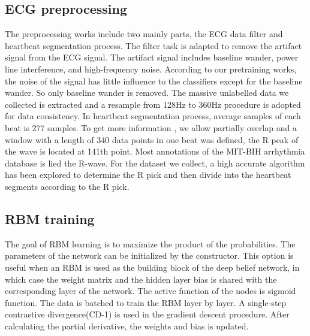 \documentclass[conference]{IEEEtran}
\begin{document}
\subsection{ECG preprocessing}

The preprocessing works include two mainly parts, the ECG data filter and heartbeat segmentation process. The filter task is adapted to remove the artifact signal from the ECG signal. The artifact signal includes baseline wander, power line interference, and high-frequency noise. According to our pretraining works, the noise of the signal has little influence to the classifiers except for the baseline wander. So only baseline wander is removed. The massive unlabelled data we collected is extracted and a resample from 128Hz to 360Hz procedure is adopted for data consistency. In heartbeat segmentation process, average samples of each beat is 277 samples. To get more information , we allow partially overlap and a window with a length of 340 data points in one beat was defined, the R peak of the wave is located at 141th point. Most annotations of the MIT-BIH arrhythmia database is lied the R-wave. For the dataset we collect, a high accurate algorithm has been explored to determine the R pick and then divide into the heartbeat segments according to the R pick.

\subsection{RBM training}

The goal of RBM learning is to maximize the product of the probabilities. The parameters of the network can be initialized by the constructor. This option is useful when an RBM is used as the building block of the deep belief network, in which case the weight matrix and the hidden layer bias is shared with the corresponding layer of the network. The active function of the nodes is sigmoid function. The data is batched to train the RBM layer by layer. A single-step contrastive divergence(CD-1) is used in the gradient descent procedure. After calculating the partial derivative, the weights and bias is updated.
\end{document}

